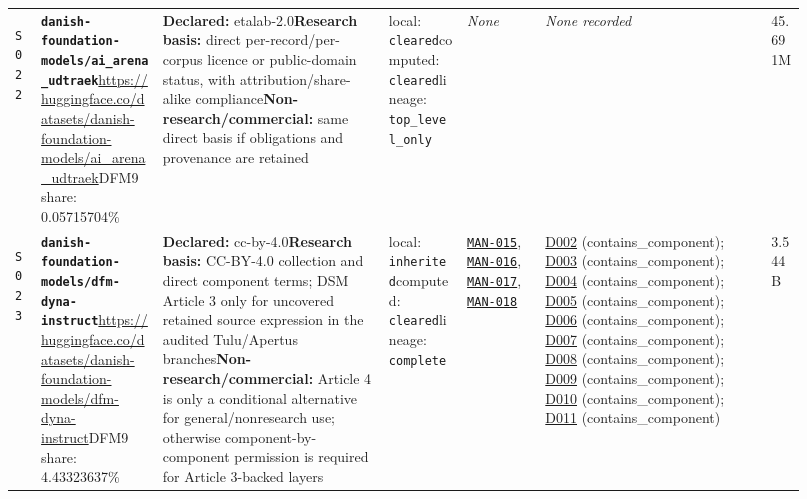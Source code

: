 \documentclass[9pt,a4paper]{article}
\newcommand{\srcid}[1]{\hypertarget{src:#1}{\texttt{#1}}}
\begin{document}
\begin{landscape}
\begin{longtable}{@{}L{0.03\linewidth}L{0.14\linewidth}L{0.26\linewidth}L{0.09\linewidth}L{0.09\linewidth}L{0.265\linewidth}L{0.045\linewidth}@{}}
\srcid{S022} & \textbf{\nolinkurl{danish-foundation-models/ai_arena_udtraek}}\newline \url{https://huggingface.co/datasets/danish-foundation-models/ai_arena_udtraek}\newline DFM9 share: 0.05715704\% & \textbf{Declared:} etalab-2.0\newline \textbf{Research basis:} direct per-record/per-corpus licence or public-domain status, with attribution/share-alike compliance\newline \textbf{Non-research/commercial:} same direct basis if obligations and provenance are retained & local: \texttt{cleared}\newline computed: \texttt{cleared}\newline lineage: \texttt{top\_level\_only} & \textit{None} & \textit{None recorded} & 45.691M \\
\srcid{S023} & \textbf{\nolinkurl{danish-foundation-models/dfm-dyna-instruct}}\newline \url{https://huggingface.co/datasets/danish-foundation-models/dfm-dyna-instruct}\newline DFM9 share: 4.43323637\% & \textbf{Declared:} cc-by-4.0\newline \textbf{Research basis:} CC-BY-4.0 collection and direct component terms; DSM Article 3 only for uncovered retained source expression in the audited Tulu/Apertus branches\newline \textbf{Non-research/commercial:} Article 4 is only a conditional alternative for general/nonresearch use; otherwise component-by-component permission is required for Article 3-backed layers & local: \texttt{inherited}\newline computed: \texttt{cleared}\newline lineage: \texttt{complete} & \hyperlink{manual:MAN-015}{\texttt{MAN-015}}, \hyperlink{manual:MAN-016}{\texttt{MAN-016}}, \hyperlink{manual:MAN-017}{\texttt{MAN-017}}, \hyperlink{manual:MAN-018}{\texttt{MAN-018}} & \hyperlink{dep:D002}{D002} (contains\_component); \hyperlink{dep:D003}{D003} (contains\_component); \hyperlink{dep:D004}{D004} (contains\_component); \hyperlink{dep:D005}{D005} (contains\_component); \hyperlink{dep:D006}{D006} (contains\_component); \hyperlink{dep:D007}{D007} (contains\_component); \hyperlink{dep:D008}{D008} (contains\_component); \hyperlink{dep:D009}{D009} (contains\_component); \hyperlink{dep:D010}{D010} (contains\_component); \hyperlink{dep:D011}{D011} (contains\_component) & 3.544B \\

\end{longtable}
\end{landscape}
\end{document}
